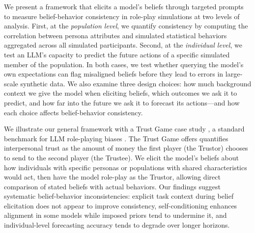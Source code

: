 \documentclass{article} %
\begin{document}

We present a framework that elicits a model’s beliefs through targeted prompts to measure belief-behavior consistency in role-play simulations at two levels of analysis. First, at the \emph{population level}, we quantify consistency by computing the correlation between persona attributes and simulated statistical behaviors aggregated across all simulated participants. Second, at the \emph{individual level}, we test an LLM’s capacity to predict the future actions of a specific simulated member of the population. In both cases, we test whether querying the model’s own expectations can flag misaligned beliefs before they lead to errors in large‐scale synthetic data. We also examine three design choices: how much background context we give the model when eliciting beliefs, which outcomes we ask it to predict, and how far into the future we ask it to forecast its actions—and how each choice affects belief-behavior consistency.


We illustrate our general framework with a Trust Game case study \citep{berg1995trust}, a standard benchmark for LLM role-playing biases \citep{wei2024uncovering, xie2024can}. The Trust Game offers quantifies interpersonal trust as the amount of money the first player (the Trustor) chooses to send to the second player (the Trustee). We elicit the model's beliefs about how individuals with specific personas or populations with shared characteristics would act, then have the model role-play as the Trustor, allowing direct comparison of stated beliefs with actual behaviors. Our findings suggest systematic belief-behavior inconsistencies: explicit task context during belief elicitation does not appear to improve consistency, self-conditioning enhances alignment in some models while imposed priors tend to undermine it, and individual-level forecasting accuracy tends to degrade over longer horizons.
\end{document}
